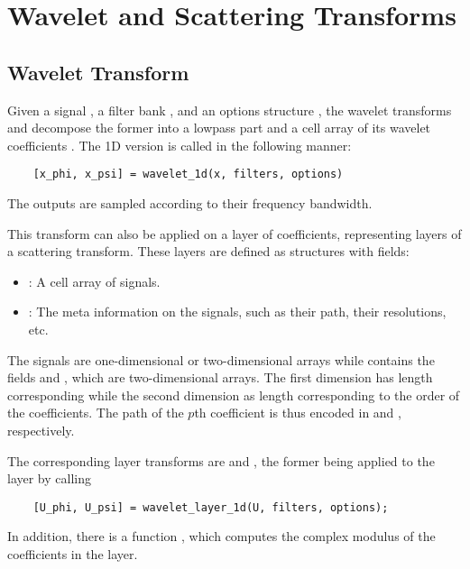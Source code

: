 \documentclass[twocolumn]{article}
\begin{document}
\section{Wavelet and Scattering Transforms}

\subsection{Wavelet Transform}

Given a signal , a filter bank , and an options structure , the wavelet transforms  and  decompose the former into a lowpass part  and a cell array of its wavelet coefficients . The 1D version is called in the following manner:
\begin{lstlisting}
	[x_phi, x_psi] = wavelet_1d(x, filters, options)
\end{lstlisting}
The outputs are sampled according to their frequency bandwidth.

This transform can also be applied on a layer of coefficients, representing layers of a scattering transform. These layers are defined as structures with fields:
\begin{itemize}
	\item {}: A cell array of signals.
	\item {}: The meta information on the signals, such as their path, their resolutions, etc.
\end{itemize}
The signals are one-dimensional or two-dimensional arrays while  contains the fields  and , which are two-dimensional
arrays. The first dimension has length corresponding  while the second dimension as length corresponding to the order of the coefficients.
The path of the $p$th coefficient is thus encoded in  and , respectively.

The corresponding layer transforms are  and , the former being applied to the layer  by calling
\begin{lstlisting}
	[U_phi, U_psi] = wavelet_layer_1d(U, filters, options);
\end{lstlisting}

In addition, there is a function , which computes the complex modulus of the coefficients in the layer.
\end{document}
